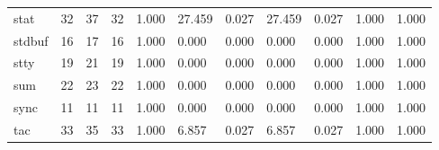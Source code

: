 \begin{longtable}{lp{1.8cm}p{1.8cm}p{1.8cm}p{1.8cm}p{1.8cm}p{1.8cm}p{1.8cm}p{1.8cm}p{1.8cm}p{1.8cm}}
stat      &                           32 &                 37 &                                32 &                                      1.000 &                                 27.459 &                                        0.027 &                            27.459 &                                   0.027 &                              1.000 &                                              1.000 \\
stdbuf    &                           16 &                 17 &                                16 &                                      1.000 &                                  0.000 &                                        0.000 &                             0.000 &                                   0.000 &                              1.000 &                                              1.000 \\
stty      &                           19 &                 21 &                                19 &                                      1.000 &                                  0.000 &                                        0.000 &                             0.000 &                                   0.000 &                              1.000 &                                              1.000 \\
sum       &                           22 &                 23 &                                22 &                                      1.000 &                                  0.000 &                                        0.000 &                             0.000 &                                   0.000 &                              1.000 &                                              1.000 \\
sync      &                           11 &                 11 &                                11 &                                      1.000 &                                  0.000 &                                        0.000 &                             0.000 &                                   0.000 &                              1.000 &                                              1.000 \\
tac       &                           33 &                 35 &                                33 &                                      1.000 &                                  6.857 &                                        0.027 &                             6.857 &                                   0.027 &                              1.000 &                                              1.000 \\

\end{longtable}
